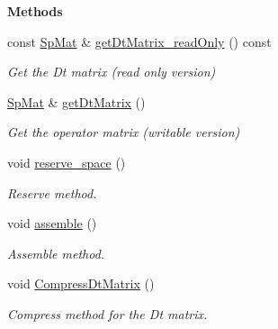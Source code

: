 \begin{Indent}{\bf Methods}\par
\begin{DoxyCompactItemize}
\item 
const \hyperlink{namespaceFVCode3D_ac1032289d96638cf0ad6c52ef639095f}{Sp\+Mat} \& \hyperlink{classFVCode3D_1_1global__Div_a8f3304e07af4e5e31321a6f07812f9f6}{get\+Dt\+Matrix\+\_\+read\+Only} () const 
\begin{DoxyCompactList}\small\item\em Get the Dt matrix (read only version) \end{DoxyCompactList}\item 
\hyperlink{namespaceFVCode3D_ac1032289d96638cf0ad6c52ef639095f}{Sp\+Mat} \& \hyperlink{classFVCode3D_1_1global__Div_a9666f55d6fc6ea814844e16a3150fda9}{get\+Dt\+Matrix} ()
\begin{DoxyCompactList}\small\item\em Get the operator matrix (writable version) \end{DoxyCompactList}\item 
void \hyperlink{classFVCode3D_1_1global__Div_ac64b9c015a41c89a8358c48626a37744}{reserve\+\_\+space} ()
\begin{DoxyCompactList}\small\item\em Reserve method. \end{DoxyCompactList}\item 
void \hyperlink{classFVCode3D_1_1global__Div_a57a22172d3cf6f1e45d00de946befc68}{assemble} ()
\begin{DoxyCompactList}\small\item\em Assemble method. \end{DoxyCompactList}\item 
void \hyperlink{classFVCode3D_1_1global__Div_a44a6174614373e40dab816d9748b8bd9}{Compress\+Dt\+Matrix} ()
\begin{DoxyCompactList}\small\item\em Compress method for the Dt matrix. \end{DoxyCompactList}\end{DoxyCompactItemize}
\end{Indent}
